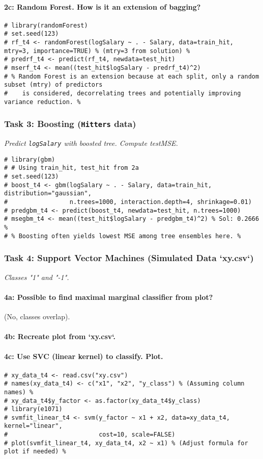 \documentclass[12pt,a4paper]{article}
\newcommand{\Robject}[1]{\texttt{#1}} %
\newcommand{\Rcode}[1]{\texttt{#1}} %
\begin{document}
            \paragraph{2c: Random Forest. How is it an extension of bagging?}
\begin{lstlisting}
# library(randomForest)
# set.seed(123)
# rf_t4 <- randomForest(logSalary ~ . - Salary, data=train_hit, mtry=3, importance=TRUE) % (mtry=3 from solution) %
# predrf_t4 <- predict(rf_t4, newdata=test_hit)
# mserf_t4 <- mean((test_hit$logSalary - predrf_t4)^2)
# % Random Forest is an extension because at each split, only a random subset (mtry) of predictors
#    is considered, decorrelating trees and potentially improving variance reduction. %
\end{lstlisting}

        \subsubsection{Task 3: Boosting (\Robject{Hitters} data)}
            \textit{Predict \Rcode{logSalary} with boosted tree. Compute testMSE.}
\begin{lstlisting}
# library(gbm)
# # Using train_hit, test_hit from 2a
# set.seed(123)
# boost_t4 <- gbm(logSalary ~ . - Salary, data=train_hit, distribution="gaussian",
#                 n.trees=1000, interaction.depth=4, shrinkage=0.01)
# predgbm_t4 <- predict(boost_t4, newdata=test_hit, n.trees=1000)
# msegbm_t4 <- mean((test_hit$logSalary - predgbm_t4)^2) % Sol: 0.2666 %
# % Boosting often yields lowest MSE among tree ensembles here. %
\end{lstlisting}

        \subsubsection{Task 4: Support Vector Machines (Simulated Data `xy.csv`)}
            \textit{Classes "1" and "-1".}
            \paragraph{4a: Possible to find maximal marginal classifier from plot?} (No, classes overlap).
            \paragraph{4b: Recreate plot from `xy.csv`.}
            \paragraph{4c: Use SVC (linear kernel) to classify. Plot.}
\begin{lstlisting}
# xy_data_t4 <- read.csv("xy.csv") 
# names(xy_data_t4) <- c("x1", "x2", "y_class") % (Assuming column names) %
# xy_data_t4$y_factor <- as.factor(xy_data_t4$y_class)
# library(e1071)
# svmfit_linear_t4 <- svm(y_factor ~ x1 + x2, data=xy_data_t4, kernel="linear", 
#                         cost=10, scale=FALSE)
# plot(svmfit_linear_t4, xy_data_t4, x2 ~ x1) % (Adjust formula for plot if needed) %
\end{lstlisting}
\end{document}
